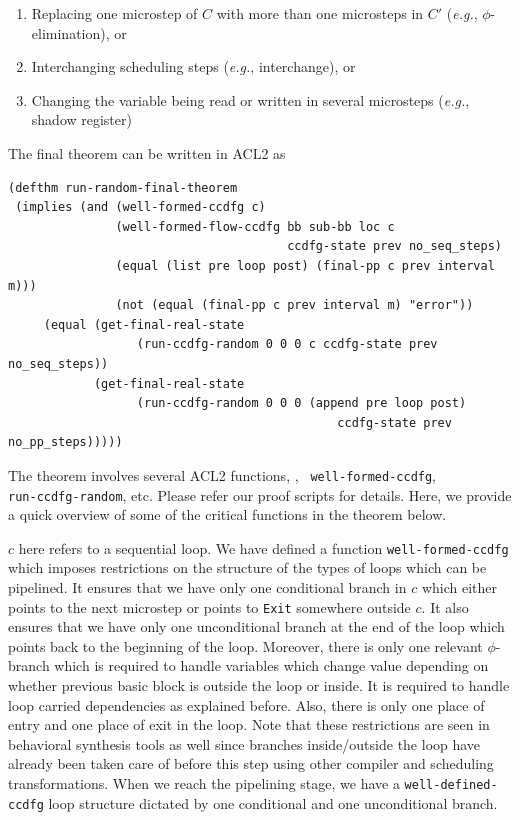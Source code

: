 \begin{enumerate}
\item Replacing one microstep of $C$ with more than one
  microsteps in $C'$ ({\em e.g.}, $\phi$-elimination), or
\item Interchanging scheduling steps ({\em e.g.},
  interchange), or
\item Changing the variable being read or written in several
  microsteps ({\em e.g.}, shadow register)
\end{enumerate}

The final theorem can be written in ACL2 as 
\small
\begin{verbatim}
(defthm run-random-final-theorem
 (implies (and (well-formed-ccdfg c)
               (well-formed-flow-ccdfg bb sub-bb loc c 
                                       ccdfg-state prev no_seq_steps)
               (equal (list pre loop post) (final-pp c prev interval m)))
               (not (equal (final-pp c prev interval m) "error"))
     (equal (get-final-real-state 
                  (run-ccdfg-random 0 0 0 c ccdfg-state prev no_seq_steps))
            (get-final-real-state 
                  (run-ccdfg-random 0 0 0 (append pre loop post) 
                                              ccdfg-state prev no_pp_steps)))))
\end{verbatim}
\normalsize

The theorem involves several ACL2 functions, \eg, {\tt
well-formed-ccdfg}, \\
{\tt run-ccdfg-random}, etc. Please refer 
our proof scripts for details. Here, we provide a quick overview 
of some of the critical functions in the theorem
below.  

\noindent
$c$ here refers to a sequential loop. We have defined a function {\tt well-formed-ccdfg} 
which imposes restrictions on the structure of the types of loops which can be pipelined. It ensures 
that we have only one conditional branch in $c$ which either points to the next microstep or points to {\tt Exit} somewhere outside $c$. 
It also ensures that we have only one unconditional branch at the end of the loop which points back to the 
beginning of the loop. Moreover, there is only one relevant $\phi$-branch
which is required to handle variables which change value depending on whether previous basic block is outside the loop
or inside. It is required to handle loop carried dependencies as explained before. 
Also, there is only one place of entry and one place of exit in the loop. 
Note that these restrictions are seen in behavioral synthesis tools as well since branches inside/outside the 
loop have already been taken care of before this step using other compiler and scheduling transformations. 
When we reach the pipelining stage, 
we have a {\tt well-defined-ccdfg} loop structure dictated by one conditional and one unconditional branch.

